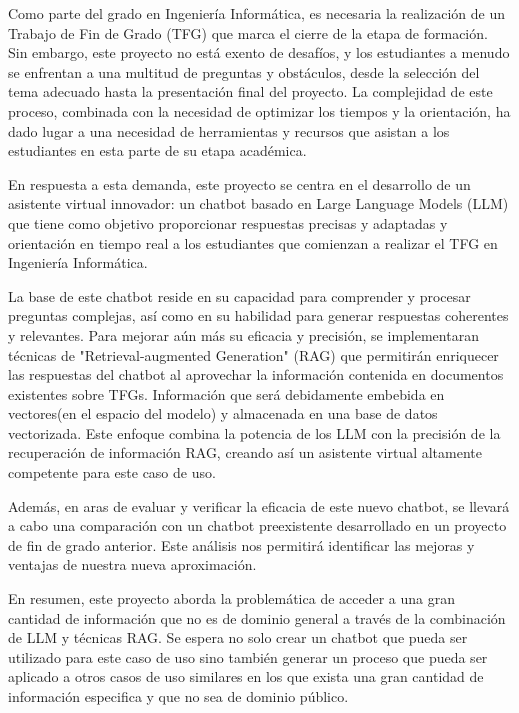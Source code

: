 
Como parte del grado en Ingeniería Informática, es necesaria la realización de un Trabajo de Fin de Grado (TFG) que marca el cierre de la etapa de formación. Sin embargo, este proyecto no está exento de desafíos, y los estudiantes a menudo se enfrentan a una multitud de preguntas y obstáculos, desde la selección del tema adecuado hasta la presentación final del proyecto\cite{lopez2010final}. La complejidad de este proceso, combinada con la necesidad de optimizar los tiempos y la orientación, ha dado lugar a una necesidad de herramientas y recursos que asistan a los estudiantes en esta parte de su etapa académica\cite{lopez2009proceso}.

En respuesta a esta demanda, este proyecto se centra en el desarrollo de un asistente virtual innovador: un chatbot basado en Large Language Models (LLM) que tiene como objetivo proporcionar respuestas precisas y adaptadas y orientación en tiempo real a los estudiantes que comienzan a realizar el TFG en Ingeniería Informática\cite{Lewis2023}.

La base de este chatbot reside en su capacidad para comprender y procesar preguntas complejas, así como en su habilidad para generar respuestas coherentes y relevantes. Para mejorar aún más su eficacia y precisión, se implementaran técnicas de "Retrieval-augmented Generation" (RAG) que permitirán enriquecer las respuestas del chatbot al aprovechar la información contenida en documentos existentes sobre TFGs. Información que será debidamente embebida en vectores(en el espacio del modelo) y almacenada en una base de datos vectorizada. Este enfoque combina la potencia de los LLM con la precisión de la recuperación de información RAG, creando así un asistente virtual altamente competente para este caso de uso.

Además, en aras de evaluar y verificar la eficacia de este nuevo chatbot, se llevará a cabo una comparación con un chatbot preexistente desarrollado en un proyecto de fin de grado anterior. Este análisis nos permitirá identificar las mejoras y ventajas de nuestra nueva aproximación.

En resumen, este proyecto aborda la problemática de acceder a una gran cantidad de información que no es de dominio general a través de la combinación de LLM y técnicas RAG. Se espera no solo crear un chatbot que pueda ser utilizado para este caso de uso sino también generar un proceso que pueda ser aplicado a otros casos de uso similares en los que exista una gran cantidad de información especifica y que no sea de dominio público. 




